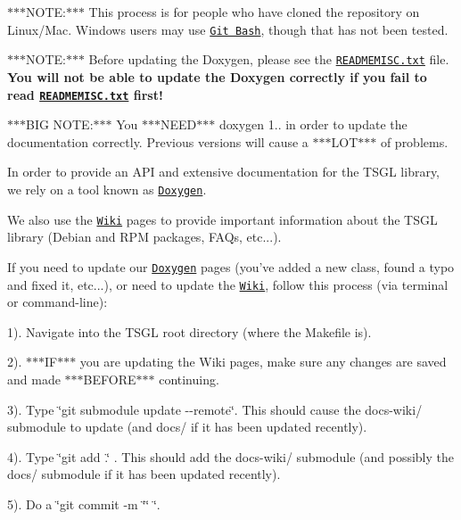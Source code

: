 $\ast$$\ast$$\ast$\-N\-O\-T\-E\-:$\ast$$\ast$$\ast$ This process is for people who have cloned the repository on Linux/\-Mac. Windows users may use \href{https://git-scm.com/download/win}{\tt Git Bash}, though that has not been tested.

$\ast$$\ast$$\ast$\-N\-O\-T\-E\-:$\ast$$\ast$$\ast$ Before updating the Doxygen, please see the \href{https://github.com/Calvin-CS/TSGL/blob/master/READMEMISC.txt}{\tt R\-E\-A\-D\-M\-E\-M\-I\-S\-C.\-txt} file. {\bfseries You will not be able to update the Doxygen correctly if you fail to read \href{https://github.com/Calvin-CS/TSGL/blob/master/READMEMISC.txt}{\tt R\-E\-A\-D\-M\-E\-M\-I\-S\-C.\-txt} first!}

$\ast$$\ast$$\ast$\-B\-I\-G N\-O\-T\-E\-:$\ast$$\ast$$\ast$ You $\ast$$\ast$$\ast$\-N\-E\-E\-D$\ast$$\ast$$\ast$ doxygen 1.. in order to update the documentation correctly. Previous versions will cause a $\ast$$\ast$$\ast$\-L\-O\-T$\ast$$\ast$$\ast$ of problems.

In order to provide an A\-P\-I and extensive documentation for the T\-S\-G\-L library, we rely on a tool known as \href{http://www.stack.nl/~dimitri/doxygen/}{\tt Doxygen}.

We also use the \href{https://github.com/Calvin-CS/TSGL/wiki}{\tt Wiki} pages to provide important information about the T\-S\-G\-L library (Debian and R\-P\-M packages, F\-A\-Qs, etc...).

If you need to update our \href{http://calvin-cs.github.io/TSGL/html/annotated.html}{\tt Doxygen} pages (you've added a new class, found a typo and fixed it, etc...), or need to update the \href{https://github.com/Calvin-CS/TSGL/wiki}{\tt Wiki}, follow this process (via terminal or command-\/line)\-:

1). Navigate into the T\-S\-G\-L root directory (where the Makefile is).

2). $\ast$$\ast$$\ast$\-I\-F$\ast$$\ast$$\ast$ you are updating the Wiki pages, make sure any changes are saved and made $\ast$$\ast$$\ast$\-B\-E\-F\-O\-R\-E$\ast$$\ast$$\ast$ continuing.

3). Type \char`\"{}git submodule update -\/-\/remote\char`\"{}. This should cause the docs-\/wiki/ submodule to update (and docs/ if it has been updated recently).

4). Type \char`\"{}git add .\char`\"{} . This should add the docs-\/wiki/ submodule (and possibly the docs/ submodule if it has been updated recently).

5). Do a \char`\"{}git commit -\/m \char`\"{}\char`\"{} \char`\"{}.

